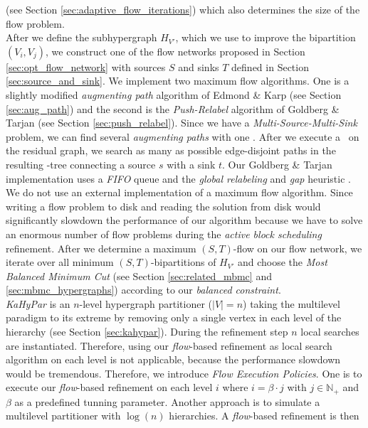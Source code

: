 (see Section \ref{sec:adaptive_flow_iterations}) which also determines
the size of the flow problem. \\
After we define the subhypergraph $H_{V'}$, which we use to improve the bipartition
$(V_i,V_j)$, we construct one of the flow networks proposed in Section
\ref{sec:opt_flow_network} with sources $S$ and sinks $T$ defined in
Section \ref{sec:source_and_sink}. We implement two maximum flow algorithms.
One is a slightly modified \emph{augmenting path} algorithm of Edmond \& Karp
\cite{edmonds1972theoretical} (see Section \ref{sec:aug_path}) 
and the second is the \emph{Push-Relabel} algorithm of
Goldberg \& Tarjan \cite{cherkassky1997implementing,goldberg1988new} 
(see Section \ref{sec:push_relabel}). Since we have a 
\emph{Multi-Source-Multi-Sink} problem, we can find several \emph{augmenting paths}
with one \BFS. After we execute a \BFS~on the residual graph, we search 
as many as possible edge-disjoint paths in the resulting \BFS-tree connecting a source $s$
with a sink $t$. Our Goldberg \& Tarjan implementation uses a \emph{FIFO} queue and
the \emph{global relabeling} and \emph{gap} heuristic \cite{cherkassky1997implementing}.
We do not use an external implementation of a maximum flow algorithm.
Since writing a flow problem to disk and reading the
solution from disk would significantly slowdown the performance of our algorithm because we have
to solve an enormous number of flow problems during the \emph{active block scheduling}
refinement. After we determine a maximum $(S,T)$-flow on our flow network, we iterate over
all minimum $(S,T)$-bipartitions of $H_{V'}$ \cite{picard1980structure} and choose 
the \emph{Most Balanced Minimum Cut} (see Section \ref{sec:related_mbmc} and 
\ref{sec:mbmc_hypergraphs}) according to our \emph{balanced constraint}. \\
\emph{KaHyPar} is an $n$-level hypergraph partitioner ($|V| = n$) taking the 
multilevel paradigm to its extreme by removing only a single vertex in each level
of the hierarchy \cite{akhremtsev2017engineering} (see Section \ref{sec:kahypar}). 
During the refinement step $n$ local searches are instantiated. Therefore, 
using our \emph{flow}-based refinement as local search algorithm on each level is not 
applicable, because the performance slowdown would be tremendous. Therefore,
we introduce \emph{Flow Execution Policies}. One is to execute our \emph{flow}-based
refinement on each level $i$ where $i = \beta\cdot j$ with $j \in \mathbb{N}_+$ and
$\beta$ as a predefined tunning parameter. Another approach is to simulate a
multilevel partitioner with $\log(n)$ hierarchies. A \emph{flow}-based refinement is then
